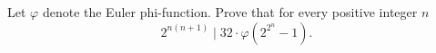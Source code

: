 Let $\varphi$ denote the Euler phi-function. Prove that for every positive integer $n$
$$2^{n(n+1)}\mid 32\cdot\varphi\left(2^{2^n}-1\right).$$
